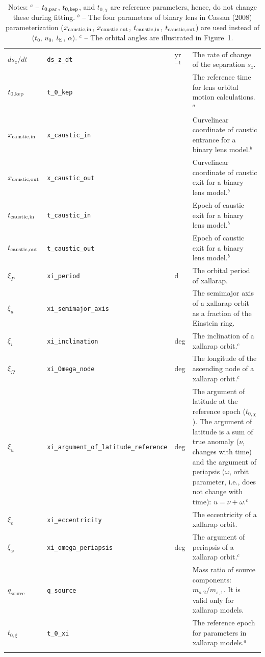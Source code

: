 \documentclass[12pt]{article}
\begin{document}
\begin{landscape}
\begin{longtable}{l l l p{12cm}}
$ds_{z}/dt$ & {\tt ds\_z\_dt} & yr$^{-1}$ & The rate of change of the separation $s_{z}$. \\
$t_{0,{\rm kep}}$ & {\tt t\_0\_kep} & & The reference time for lens orbital motion calculations.$^a$ \\
$x_{\rm caustic, in}$ & {\tt x\_caustic\_in} & & Curvelinear coordinate of caustic entrance for a binary lens model.$^b$ \\
$x_{\rm caustic, out}$ & {\tt x\_caustic\_out} & & Curvelinear coordinate of caustic exit for a binary lens model.$^b$ \\
$t_{\rm caustic, in}$ & {\tt t\_caustic\_in} & & Epoch of caustic exit for a binary lens model.$^b$ \\
$t_{\rm caustic, out}$ & {\tt t\_caustic\_out} & & Epoch of caustic exit for a binary lens model.$^b$ \\
$\xi_P$ & \texttt{xi\_period} & d & The orbital period of xallarap.\\
$\xi_a$ & \texttt{xi\_semimajor\_axis} & & The semimajor axis of a xallarap orbit as a fraction of the Einstein ring.\\
$\xi_i$ & \texttt{xi\_inclination} & deg & The inclination of a xallarap orbit.$^c$\\
$\xi_\Omega$ & \texttt{xi\_Omega\_node} & deg & The longitude of the ascending node of a xallarap orbit.$^c$\\
$\xi_u$ & \texttt{xi\_argument\_of\_latitude\_reference} & deg & The argument of latitude at the reference epoch ($t_{0,\chi}$). The argument of latitude is a sum of true anomaly ($\nu$, changes with time) and the argument of periapsis ($\omega$, orbit parameter, i.e., does not change with time): $u = \nu + \omega$.$^c$\\
$\xi_e$ & \texttt{xi\_eccentricity} & & The eccentricity of a xallarap orbit.\\
$\xi_\omega$ & \texttt{xi\_omega\_periapsis} & deg & The argument of periapsis of a xallarap orbit.$^c$\\
$q_\mathrm{source}$ & \texttt{q\_source} & & Mass ratio of source components: $m_{s,2}/m_{s,1}$. It is valid only for xallarap models.\\
$t_{0,\xi}$ & \texttt{t\_0\_xi} & &  The reference epoch for parameters in xallarap models.$^a$\\
\hline
\caption{Notes: \newline
$^a$ -- $t_{0,{\rm par}}$, $t_{0,{\rm kep}}$, and $t_{0,\chi}$ are reference parameters, hence, do not change these during fitting. \newline
$^b$ -- The four parameters of binary lens in Cassan (2008) parameterization ($x_{\rm caustic, in}$, $x_{\rm caustic, out}$, $t_{\rm caustic, in}$, $t_{\rm caustic, out}$) are used instead of ($t_0$, $u_0$, $t_{\rm E}$, $\alpha$). \newline
$^c$ -- The orbital angles are illustrated in Figure~1.
}
\end{longtable}
\end{landscape}
\end{document}
